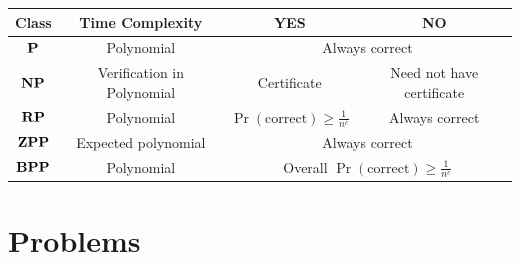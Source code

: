 \begin{center}
\begin{tabular}{|c|c|c|c|}
\hline
\textbf{Class} & \textbf{Time Complexity} &
\textbf{YES} & \textbf{NO}\\
\hline

$\mathbf{P}$ & Polynomial & \multicolumn{2}{c|}{Always correct}\\
\hline

$\mathbf{NP}$ & Verification in Polynomial & Certificate & Need not have certificate\\
\hline

$\mathbf{RP}$ & Polynomial & $\Pr(\text{correct}) \ge \frac{1}{n^c}$ & Always correct\\
\hline

$\mathbf{ZPP}$ & Expected polynomial & \multicolumn{2}{c|}{Always correct}\\
\hline

$\mathbf{BPP}$ & Polynomial & \multicolumn{2}{c|}{Overall $\Pr(\text{correct}) \ge \frac{1}{n^c}$}\\
\hline

\end{tabular}
\end{center}

\clearpage
\section{Problems}


